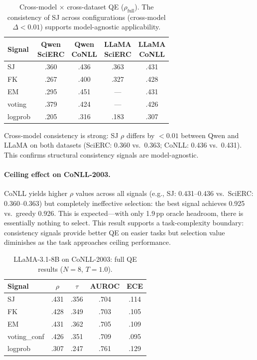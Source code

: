 \documentclass[11pt,a4paper]{article}
\begin{document}
\begin{table}[t]
\centering
\small
\caption{Cross-model $\times$ cross-dataset QE ($\rho_{\text{full}}$). The consistency of SJ across configurations (cross-model $\Delta < 0.01$) supports model-agnostic applicability.}
\label{tab:crossmodel}
\begin{tabular}{lcccc}
\toprule
Signal & \makecell{Qwen\\SciERC} & \makecell{Qwen\\CoNLL} & \makecell{LLaMA\\SciERC} & \makecell{LLaMA\\CoNLL} \\
\midrule
SJ & .360 & .436 & .363 & .431 \\
FK & .267 & .400 & .327 & .428 \\
EM & .295 & .451 & --- & .431 \\
voting & .379 & .424 & --- & .426 \\
logprob & .205 & .316 & .183 & .307 \\
\bottomrule
\end{tabular}
\end{table}

Cross-model consistency is strong: SJ $\rho$ differs by $<0.01$ between Qwen and LLaMA on both datasets (SciERC: 0.360 vs.\ 0.363; CoNLL: 0.436 vs.\ 0.431). This confirms structural consistency signals are model-agnostic.

\paragraph{Ceiling effect on CoNLL-2003.} CoNLL yields higher $\rho$ values across all signals (e.g., SJ: 0.431--0.436 vs.\ SciERC: 0.360--0.363) but completely ineffective selection: the best signal achieves 0.925 vs.\ greedy 0.926. This is expected---with only 1.9\,pp oracle headroom, there is essentially nothing to select. This result supports a task-complexity boundary: consistency signals provide better QE on easier tasks but selection value diminishes as the task approaches ceiling performance.

\begin{table}[t]
\centering
\small
\caption{LLaMA-3.1-8B on CoNLL-2003: full QE results ($N{=}8$, $T{=}1.0$).}
\label{tab:llama-conll}
\begin{tabular}{lcccc}
\toprule
Signal & $\rho$ & $\tau$ & AUROC & ECE \\
\midrule
SJ & .431 & .356 & .704 & .114 \\
FK & .428 & .349 & .703 & .105 \\
EM & .431 & .362 & .705 & .109 \\
voting\_conf & .426 & .351 & .709 & .095 \\
logprob & .307 & .247 & .761 & .129 \\
\bottomrule
\end{tabular}
\end{table}
\end{document}
